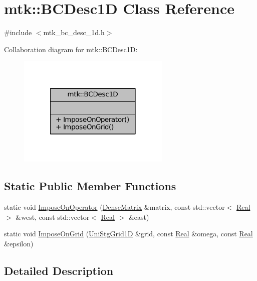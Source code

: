 \hypertarget{classmtk_1_1BCDesc1D}{\section{mtk\-:\-:B\-C\-Desc1\-D Class Reference}
\label{classmtk_1_1BCDesc1D}
}


{\ttfamily \#include $<$mtk\-\_\-bc\-\_\-desc\-\_\-1d.\-h$>$}



Collaboration diagram for mtk\-:\-:B\-C\-Desc1\-D\-:
\nopagebreak
\begin{figure}[H]
\begin{center}
\leavevmode
\includegraphics[width=206pt]{classmtk_1_1BCDesc1D__coll__graph}
\end{center}
\end{figure}
\subsection*{Static Public Member Functions}
\begin{DoxyCompactItemize}
\item 
static void \hyperlink{classmtk_1_1BCDesc1D_a4dcf1ac4198402113591fde97dfa3260}{Impose\-On\-Operator} (\hyperlink{classmtk_1_1DenseMatrix}{Dense\-Matrix} \&matrix, const std\-::vector$<$ \hyperlink{group__c01-roots_gac080bbbf5cbb5502c9f00405f894857d}{Real} $>$ \&west, const std\-::vector$<$ \hyperlink{group__c01-roots_gac080bbbf5cbb5502c9f00405f894857d}{Real} $>$ \&east)
\item 
static void \hyperlink{classmtk_1_1BCDesc1D_a79a659c6a6333af8e51c463cf1ecb0b7}{Impose\-On\-Grid} (\hyperlink{classmtk_1_1UniStgGrid1D}{Uni\-Stg\-Grid1\-D} \&grid, const \hyperlink{group__c01-roots_gac080bbbf5cbb5502c9f00405f894857d}{Real} \&omega, const \hyperlink{group__c01-roots_gac080bbbf5cbb5502c9f00405f894857d}{Real} \&epsilon)
\end{DoxyCompactItemize}


\subsection{Detailed Description}


